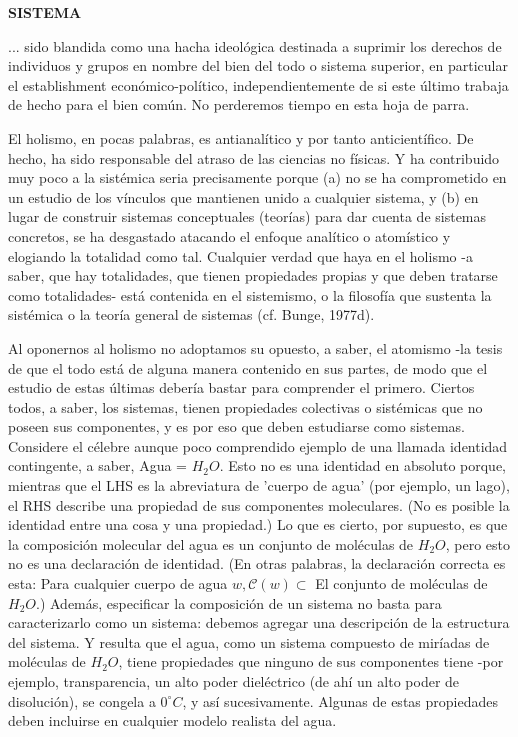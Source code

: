 \newpage
\fancyhf{}
\fancyhead[r]{\thepage}
\begin{center}
{\fontsize{13}{16}\selectfont \textbf{SISTEMA}}
\end{center}
\vspace{0.5cm}

{\fontsize{13}{15}\selectfont
... sido blandida como una hacha ideológica destinada a suprimir los derechos de individuos y grupos en nombre del bien del todo o sistema superior, 
en particular el establishment económico-político, independientemente de si este último trabaja de hecho para el bien común. 
No perderemos tiempo en esta hoja de parra.

El holismo, en pocas palabras, es antianalítico y por tanto anticientífico. De hecho, ha sido responsable del atraso de las ciencias no físicas. 
Y ha contribuido muy poco a la sistémica seria precisamente porque (a) no se ha comprometido en un estudio de los vínculos que mantienen unido a cualquier sistema, 
y (b) en lugar de construir sistemas conceptuales (teorías) para dar cuenta de sistemas concretos, se ha desgastado atacando el enfoque analítico o atomístico y elogiando la totalidad como tal. 
Cualquier verdad que haya en el holismo -a saber, que hay totalidades, que tienen propiedades propias y que deben tratarse como totalidades- está contenida en el sistemismo, o la filosofía que sustenta la sistémica o la teoría general de sistemas (cf. Bunge, 1977d).

Al oponernos al holismo no adoptamos su opuesto, a saber, el atomismo -la tesis de que el todo está de alguna manera contenido en sus partes, de modo que el estudio de estas últimas debería bastar para comprender el primero. 
Ciertos todos, a saber, los sistemas, tienen propiedades colectivas o sistémicas que no poseen sus componentes, y es por eso que deben estudiarse como sistemas. Considere el célebre aunque poco comprendido ejemplo de una llamada identidad contingente, 
a saber, Agua = \( H_2O \). Esto no es una identidad en absoluto porque, mientras que el LHS es la abreviatura de 'cuerpo de agua' (por ejemplo, un lago), el RHS describe una propiedad de sus componentes moleculares. (No es posible la identidad entre una cosa y una propiedad.) 
Lo que es cierto, por supuesto, es que la composición molecular del agua es un conjunto de moléculas de \( H_2O \), pero esto no es una declaración de identidad. (En otras palabras, la declaración correcta es esta: Para cualquier cuerpo de agua \( w, \mathcal{C}(w) \subset \) El conjunto de moléculas de \( H_2O \).) 
Además, especificar la composición de un sistema no basta para caracterizarlo como un sistema: debemos agregar una descripción de la estructura del sistema. Y resulta que el agua, como un sistema compuesto de miríadas de moléculas de \( H_2O \), tiene propiedades que ninguno de sus componentes tiene -por ejemplo, 
transparencia, un alto poder dieléctrico (de ahí un alto poder de disolución), se congela a \( 0^\circ C \), y así sucesivamente. Algunas de estas propiedades deben incluirse en cualquier modelo realista del agua.

}
